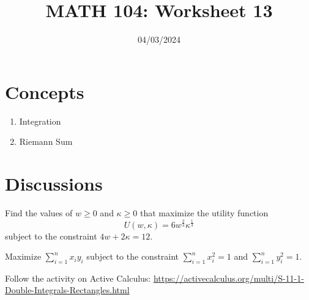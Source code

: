 \documentclass[12pt]{amsart}
\title{ MATH 104: Worksheet 13}
\author{}
\date{04/03/2024}
\begin{document}
\maketitle


\section{Concepts}

\begin{enumerate}
    \item Integration
    \item Riemann Sum
\end{enumerate}

\section{Discussions}

\begin{problem}
    Find the values of \( w \geq 0 \) and \( \kappa \geq 0 \) that maximize the utility function
\[ U(w, \kappa) = 6w^{\frac{2}{3}} \kappa^{\frac{1}{3}} \]
subject to the constraint \( 4w + 2\kappa = 12 \).
\end{problem}

\begin{problem}
    Maximize $\sum_{i=1}^n x_i y_i$ subject to the constraint
    $\sum_{i=1}^n x_i^2 = 1$
    and
    $\sum_{i=1}^n y_i^2 = 1$.
\end{problem}

\begin{problem}
Follow the activity on Active Calculus:
\url{https://activecalculus.org/multi/S-11-1-Double-Integrals-Rectangles.html}
\end{problem}
\end{document}
